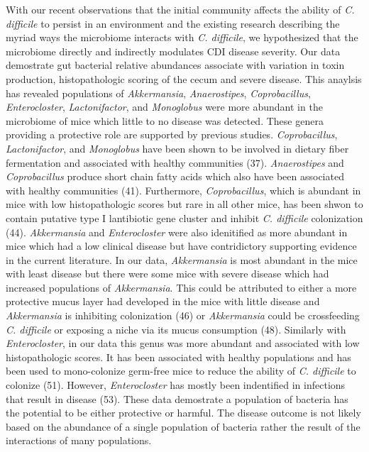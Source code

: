 \documentclass[
  12pt,
]{article}
\begin{document}
With our recent observations that the initial community affects the
ability of \emph{C. difficile} to persist in an environment and the
existing research describing the myriad ways the microbiome interacts
with \emph{C. difficile}, we hypothesized that the microbiome directly
and indirectly modulates CDI disease severity. Our data demostrate gut
bacterial relative abundances associate with variation in toxin
production, histopathologic scoring of the cecum and severe disease.
This anaylsis has revealed populations of \emph{Akkermansia},
\emph{Anaerostipes}, \emph{Coprobacillus}, \emph{Enterocloster},
\emph{Lactonifactor}, and \emph{Monoglobus} were more abundant in the
microbiome of mice which little to no disease was detected. These genera
providing a protective role are supported by previous studies.
\emph{Coprobacillus}, \emph{Lactonifactor}, and \emph{Monoglobus} have
been shown to be involved in dietary fiber fermentation and associated
with healthy communities (37). \emph{Anaerostipes} and
\emph{Coprobacillus} produce short chain fatty acids which also have
been associated with healthy communities (41). Furthermore,
\emph{Coprobacillus}, which is abundant in mice with low histopathologic
scores but rare in all other mice, has been shwon to contain putative
type I lantibiotic gene cluster and inhibit \emph{C. difficile}
colonization (44). \emph{Akkermansia} and \emph{Enterocloster} were also
idenitified as more abundant in mice which had a low clinical disease
but have contridictory supporting evidence in the current literature. In
our data, \emph{Akkermansia} is most abundant in the mice with least
disease but there were some mice with severe disease which had increased
populations of \emph{Akkermansia}. This could be attributed to either a
more protective mucus layer had developed in the mice with little
disease and \emph{Akkermansia} is inhibiting colonization (46) or
\emph{Akkermansia} could be crossfeeding \emph{C. difficile} or exposing
a niche via its mucus consumption (48). Similarly with
\emph{Enterocloster}, in our data this genus was more abundant and
associated with low histopathologic scores. It has been associated with
healthy populations and has been used to mono-colonize germ-free mice to
reduce the ability of \emph{C. difficile} to colonize (51). However,
\emph{Enterocloster} has mostly been indentified in infections that
result in disease (53). These data demostrate a population of bacteria
has the potential to be either protective or harmful. The disease
outcome is not likely based on the abundance of a single population of
bacteria rather the result of the interactions of many populations.
\end{document}
